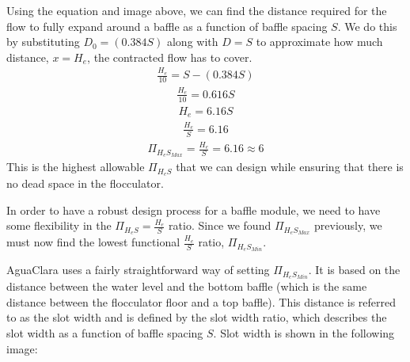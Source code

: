 \documentclass[letterpaper,10pt,english]{sphinxmanual}
\begin{document}
Using the equation and image above, we can find the distance required for the flow to fully expand around a baffle as a function of baffle spacing \(S\). We do this by substituting \(D_0 = (0.384 S)\) along with \(D = S\) to approximate how much distance, \(x = H_e\), the contracted flow has to cover.
\begin{equation}\label{equation:Flocculation/Floc_Design:Flocculation/Floc_Design:15}
\begin{split}\frac{H_e}{10} = S - (0.384 S)\end{split}
\end{equation}\begin{equation}\label{equation:Flocculation/Floc_Design:Flocculation/Floc_Design:16}
\begin{split}\frac{H_e}{10} = 0.616 S\end{split}
\end{equation}\begin{equation}\label{equation:Flocculation/Floc_Design:Flocculation/Floc_Design:17}
\begin{split}H_e = 6.16S\end{split}
\end{equation}\begin{equation}\label{equation:Flocculation/Floc_Design:Flocculation/Floc_Design:18}
\begin{split}\frac{H_e}{S} = 6.16\end{split}
\end{equation}\begin{equation}\label{equation:Flocculation/Floc_Design:Flocculation/Floc_Design:19}
\begin{split}\Pi_{H_eS_{Max}} = \frac{H_e}{S} = 6.16 \approx 6\end{split}
\end{equation}
This is the highest allowable \(\Pi_{H_eS}\) that we can design while ensuring that there is no dead space in the flocculator.









In order to have a robust design process for a baffle module, we need to have some flexibility in the \(\Pi_{H_eS} = \frac{H_e}{S}\) ratio. Since we found \(\Pi_{H_eS_{Max}}\) previously, we must now find the lowest functional \(\frac{H_e}{S}\) ratio, \(\Pi_{H_eS_{Min}}\).

AguaClara uses a fairly straightforward way of setting \(\Pi_{H_eS_{Min}}\). It is based on the distance between the water level and the bottom baffle (which is the same distance between the flocculator floor and a top baffle). This distance is referred to as the slot width  and is defined by the slot width ratio, which describes the slot width as a function of baffle spacing \(S\). Slot width is shown in the following image:
\end{document}

